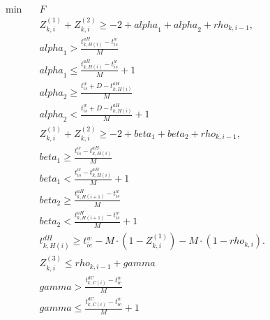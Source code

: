 \begin{align}
  \min\quad & F \tag{eq\_0047} \\
  & Z_{k , i}^{\left(1\right)} + Z_{k , i}^{\left(2\right)} \geq - 2 + \mathit{alpha}_{1} + \mathit{alpha}_{2} + \mathit{rho}_{k , i - 1} , \tag{eq\_0048} \\
  & \mathit{alpha}_{1} > \frac{t_{k , H \left(i\right)}^{a H} - t_{i s}^{w}}{M} \tag{eq\_0051\_a} \\
  & \mathit{alpha}_{1} \leq \frac{t_{k , H \left(i\right)}^{a H} - t_{i s}^{w}}{M} + 1 \tag{eq\_0051\_b} \\
  & \mathit{alpha}_{2} \geq \frac{t_{i s}^{w} + D - t_{k , H \left(i\right)}^{a H}}{M} \tag{eq\_0051\_c} \\
  & \mathit{alpha}_{2} < \frac{t_{i s}^{w} + D - t_{k , H \left(i\right)}^{a H}}{M} + 1 \tag{eq\_0051\_d} \\
  & Z_{k , i}^{\left(1\right)} + Z_{k , i}^{\left(2\right)} \geq - 2 + \mathit{beta}_{1} + \mathit{beta}_{2} + \mathit{rho}_{k , i - 1} , \tag{eq\_0052} \\
  & \mathit{beta}_{1} \geq \frac{t_{i s}^{w} - t_{k , H \left(i\right)}^{a H}}{M} \tag{eq\_0055\_a} \\
  & \mathit{beta}_{1} < \frac{t_{i s}^{w} - t_{k , H \left(i\right)}^{a H}}{M} + 1 \tag{eq\_0055\_b} \\
  & \mathit{beta}_{2} \geq \frac{t_{k , H \left(i + 1\right)}^{a H} - t_{i s}^{w}}{M} \tag{eq\_0055\_c} \\
  & \mathit{beta}_{2} < \frac{t_{k , H \left(i + 1\right)}^{a H} - t_{i s}^{w}}{M} + 1 \tag{eq\_0055\_d} \\
  & t_{k , H \left(i\right)}^{d H} \geq t_{i e}^{w} - M \cdot \left(1 - Z_{k , i}^{\left(1\right)}\right) - M \cdot \left(1 - \mathit{rho}_{k , i}\right) . \tag{eq\_0056} \\
  & Z_{k , i}^{\left(3\right)} \leq \mathit{rho}_{k , i - 1} + \mathit{gamma} \tag{eq\_0057} \\
  & \mathit{gamma} > \frac{t_{k , C \left(i\right)}^{d C} - t_{i e}^{w}}{M} \tag{eq\_0059\_a} \\
  & \mathit{gamma} \leq \frac{t_{k , C \left(i\right)}^{d C} - t_{i e}^{w}}{M} + 1 \tag{eq\_0059\_b} \\
\end{align}
